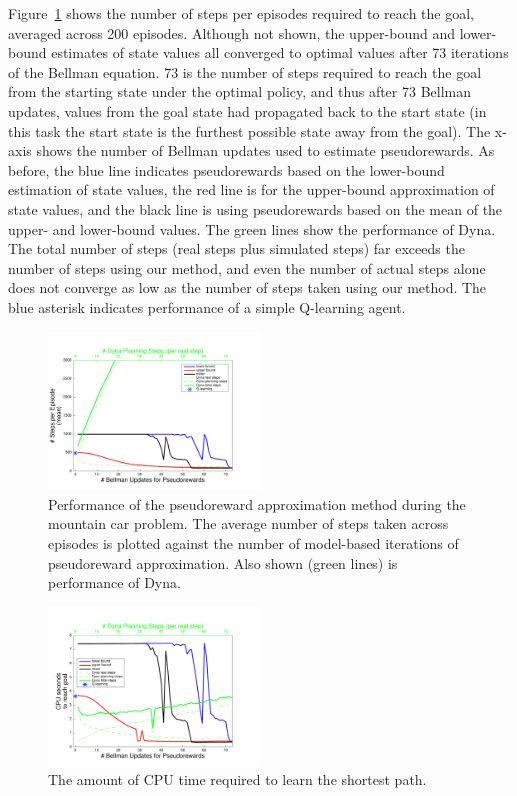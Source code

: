 \documentclass[letterpaper]{article}
\begin{document}
Figure~\ref{fig:mc1} shows the number of steps per episodes required to reach the goal, averaged across 200 episodes. Although not shown, the upper-bound and lower-bound estimates of state values all converged to optimal values after 73 iterations of the Bellman equation. 73 is the number of steps required to reach the goal from the starting state under the optimal policy, and thus after 73 Bellman updates, values from the goal state had propagated back to the start state (in this task the start state is the furthest possible state away from the goal). The x-axis shows the number of Bellman updates used to estimate pseudorewards. As before, the blue line indicates pseudorewards based on the lower-bound estimation of state values, the red line is for the upper-bound approximation of state values, and the black line is using pseudorewards based on the mean of the upper- and lower-bound values. The green lines show the performance of Dyna. The total number of steps (real steps plus simulated steps) far exceeds the number of steps using our method, and even the number of actual steps alone does not converge as low as the number of steps taken using our method. The blue asterisk indicates performance of a simple Q-learning agent.

\begin{figure}[t]
\centering
\includegraphics[width=0.5\textwidth]{MC_learning_vs_PRiterations_DYNA_mean}
\caption{Performance of the pseudoreward approximation method during the mountain car problem. The average number of steps taken across episodes is plotted against the number of model-based iterations of pseudoreward approximation. Also shown (green lines) is performance of Dyna.}
\label{fig:mc1}
\end{figure}

\begin{figure}[ht]
\centering
\includegraphics[width=0.5\textwidth]{MC_cpus_vs_PRiterations_DYNA_toGoal}
\caption{The amount of CPU time required to learn the shortest path.}
\label{fig:mc2}
\end{figure}
\end{document}
